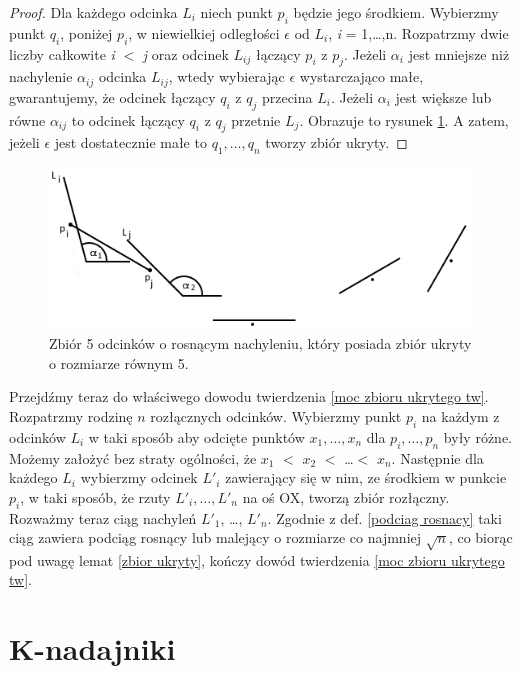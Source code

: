 \documentclass[brudnopis]{xmgr}
\begin{document}
\begin{proof}
	Dla każdego odcinka $L_i$ niech punkt $p_i$ będzie jego środkiem. Wybierzmy punkt $q_i$, poniżej $p_i$, w niewielkiej odległości $\epsilon$ od $L_i$, \textit{i} = 1,\ldots,n. Rozpatrzmy dwie liczby całkowite \textit{i} $<$ \textit{j} oraz odcinek $L_{ij}$ łączący $p_i$ z $p_j$. Jeżeli $\alpha_i$ jest mniejsze niż nachylenie $\alpha_{ij}$ odcinka $L_{ij}$, wtedy wybierając $\epsilon$ wystarczająco małe, gwarantujemy, że odcinek łączący $q_i$ z $q_j$ przecina $L_i$. Jeżeli $\alpha_i$ jest większe lub równe $\alpha_{ij}$ to odcinek łączący $q_i$ z $q_j$ przetnie $L_j$. Obrazuje to rysunek \ref{fig:5 zbior ukryty}. A zatem, jeżeli $\epsilon$ jest dostatecznie małe to  $q_1, \ldots, q_n$ tworzy zbiór ukryty. 
\end{proof}
\begin{figure}[ht!]
  \centering
   \includegraphics{rysunki/5_odcinkow_zbior_ukryty.png}
   \caption{Zbiór 5 odcinków o rosnącym nachyleniu, który posiada zbiór ukryty o rozmiarze równym 5.}
   \label{fig:5 zbior ukryty}
\end{figure}
\indent Przejdźmy teraz do właściwego dowodu twierdzenia \ref{moc zbioru ukrytego tw}. Rozpatrzmy rodzinę $n$ rozłącznych odcinków. Wybierzmy punkt $p_i$ na każdym z odcinków $L_i$ w taki sposób aby odcięte punktów $x_1,\ldots, x_n$ dla $p_i,\ldots,p_n$ były różne. Możemy założyć bez straty ogólności, że $x_1$ $<$ $x_2$ $<$ \ldots $<$ $x_n$. Następnie dla każdego $L_i$ wybierzmy odcinek $L'_i$ zawierający się w nim, ze środkiem w punkcie $p_i$, w taki sposób, że rzuty $L'_i,\ldots,L'_n$ na oś OX, tworzą zbiór rozłączny. Rozważmy teraz ciąg nachyleń $L'_1$, \ldots, $L'_n$. Zgodnie z def. \ref{podciag rosnacy} taki ciąg zawiera podciąg rosnący lub malejący o rozmiarze co najmniej $\sqrt{n}$, co biorąc pod uwagę lemat \ref{zbior ukryty}, kończy dowód twierdzenia \ref{moc zbioru ukrytego tw}.

\chapter{K-nadajniki}
\end{document}
